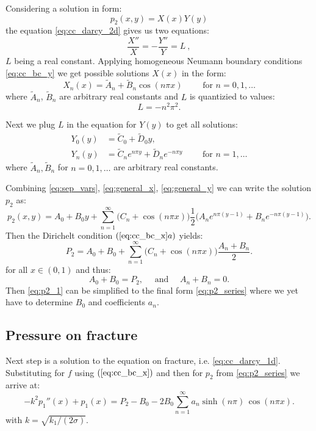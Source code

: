 \documentclass[a4paper,10pt]{article}
\begin{document}
Considering a solution in form:
\begin{equation}
    \label{eq:sep_vars}
    p_2(x,y) = X(x)Y(y) 
\end{equation}
the equation \eqref{eq:cc_darcy_2d} gives us two equations:
\[
\frac{X''}{X} = -\frac{Y''}{Y} = L\ ,
\]
$L$ being a real constant. Applying homogeneous Neumann boundary conditions \eqref{eq:cc_bc_y}
we get possible solutions $X(x)$ in the form: 
\begin{equation}
    \label{eq:general_x}
    X_n(x) = \tilde A_n + \tilde B_n \cos (n\pi x)\qquad \text{ for }n=0,1, \dots
\end{equation}
where $\tilde A_n$, $\tilde B_n$ are arbitrary real constants and $L$ is quantizied to values:
\[
    L= - n^2 \pi^2.
\]


Next we plug $L$ in the equation for $Y(y)$ to get all solutions:
\begin{align}
Y_0(y) &= \tilde C_0 + \tilde D_0 y, \nonumber \\
\label{eq:general_y}
Y_n(y) &= \tilde C_n e^{n\pi y}+ \tilde D_n e^{-n\pi y}\qquad \text{ for } n =1, \dots
\end{align}
where $\tilde A_n, \tilde B_n$ for $n=0,1,\dots$ are arbitrary real constants.

Combining \eqref{eq:sep_vars}, \eqref{eq:general_x}, \eqref{eq:general_y} we can write the solution $p_2$ as:
\begin{equation}
    \label{eq:p2_1}
    p_2(x, y) = A_0 + B_0 y + \sum ^{\infty}_{n=1} \big(C_n + \cos (n\pi x)\big) 
            \frac{1}{2}\big(A_n e^{n\pi (y-1)} + B_n e^{-n\pi (y-1)}\big).
\end{equation}
Then the Dirichelt condition $(\ref{eq:cc_bc_x}a)$ yields:
\[
    P_2 = A_0 + B_0 + \sum ^{\infty}_{n=1} \big(C_n + \cos (n\pi x)\big) 
            \frac{A_n  + B_n}{2}.
\]
for all $x\in (0, 1)$ and thus:
\[
    A_0 + B_0 = P_2, \quad\text{ and } \quad A_n+B_n = 0.
\]
Then \eqref{eq:p2_1} can be simplified to the final form \eqref{eq:p2_series} where we yet have to determine $B_0$ and coefficients $a_n$.


\subsection{Pressure on fracture}
\label{sec:p1_conductive}

 Next step is a solution to the equation on fracture, i.e. \eqref{eq:cc_darcy_1d}. 
 Substituting for $f$ using $(\ref{eq:cc_bc_x})$ and then for $p_2$ from \eqref{eq:p2_series}
 we arrive at: 
\begin{equation}
    \label{eq:p1_equation}
    -k^2 p_1''(x) + p_1 (x) = P_2 - B_0 - 2 B_0 \sum ^{\infty}_{n=1} a_n \sinh(n\pi)\, \cos (n\pi x).
\end{equation}
with $k = \sqrt{k_1 / (2 \sigma)}$.
\end{document}
